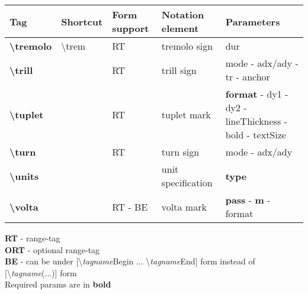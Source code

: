 \documentclass[a4paper, landscape, 10pt]{article}
\begin{document}
%
%
\begin{tabularx}{\linewidth}{p{3cm}p{4.5cm}p{3cm}p{5.5cm}l}
    \hline
    \textbf{Tag}&\textbf{Shortcut}&\textbf{Form support}&\textbf{Notation element}&\textbf{Parameters}\\
    \hline
    \textbf{\textbackslash{}tremolo}&\textbackslash{}trem&RT&tremolo sign&dur\\
    \hline
    \textbf{\textbackslash{}trill}&&RT&trill sign&mode - adx/ady - tr - anchor\\
    \hline
    \textbf{\textbackslash{}tuplet}&&RT&tuplet mark&\textbf{format} - dy1 - dy2 - lineThickness - bold - textSize\\
    \hline
    \textbf{\textbackslash{}turn}&&RT&turn sign&mode - adx/ady\\
    \hline
    \textbf{\textbackslash{}units}&&&unit specification&\textbf{type}\\
    \hline
    \textbf{\textbackslash{}volta}&&RT - BE&volta mark&\textbf{pass} - \textbf{m} - format\\
    \hline
\end{tabularx}

\bigskip

\textbf{RT} - range-tag \\
\textbf{ORT} - optional range-tag \\
\textbf{BE} - can be under [\textbackslash{}\emph{tagname}Begin ... \textbackslash{}\emph{tagname}End] form instead of [\textbackslash{}\emph{tagname}(...)] form\\
Required params are in \textbf{bold}

\newpage
\end{document}
